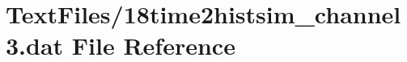 \hypertarget{18time2histsim__channel3_8dat}{}\section{Text\+Files/18time2histsim\+\_\+channel3.dat File Reference}
\label{18time2histsim__channel3_8dat}
